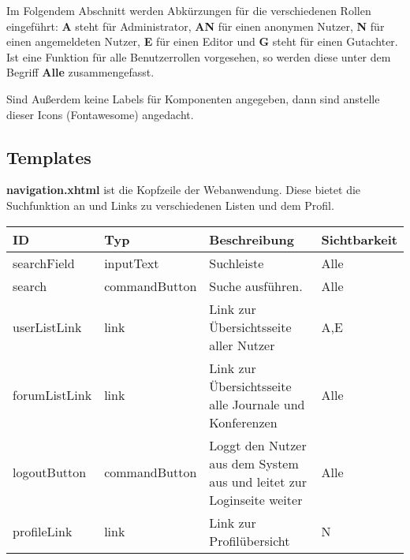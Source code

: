 \newcommand{\ftable}[1]{\begin{longtable}[H]{|m{2cm}|m{3cm}|m{6cm}|m{2.5cm}|}
                            \hline
                            \textbf{ID} & \textbf{Typ} & \textbf{Beschreibung} & \textbf{Sichtbarkeit} \\
                            \hline
                            \hline
                            #1
\end{longtable}
}

\newcommand{\fentry}[4]{#1 & #2 & #3 & #4 \\
\hline}



Im Folgendem Abschnitt werden Abkürzungen für die verschiedenen Rollen eingeführt:
\textbf{A} steht für Administrator, \textbf{AN} für einen anonymen Nutzer, \textbf{N} für einen angemeldeten Nutzer, \textbf{E} für einen Editor und \textbf{G} steht für einen Gutachter.
Ist eine Funktion für alle Benutzerrollen vorgesehen, so werden diese unter dem Begriff \textbf{Alle} zusammengefasst.

Sind Außerdem keine Labels für Komponenten angegeben, dann sind anstelle dieser Icons (Fontawesome) angedacht.

\subsection{Templates}



\begin{samepage}
    \textbf{navigation.xhtml} ist die Kopfzeile der Webanwendung. Diese bietet die Suchfunktion an und Links zu verschiedenen Listen und dem Profil.
    \nopagebreak

    \ftable{
        \fentry{searchField}{inputText}{Suchleiste}{Alle}

        \fentry{search}{commandButton}{Suche ausführen.}{Alle}

        \fentry{userListLink}{link}{Link zur Übersichtsseite aller Nutzer}{A,E}

        \fentry{forumListLink}{link}{Link zur Übersichtsseite alle Journale und Konferenzen}{Alle}

        \fentry{logoutButton}{commandButton}{Loggt den Nutzer aus dem System aus und leitet zur Loginseite weiter}{Alle}

        \fentry{profileLink}{link}{Link zur Profilübersicht}{N}

    }
\end{samepage}

